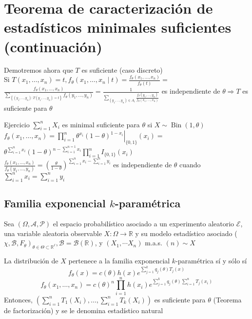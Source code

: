   \section*{Teorema de caracterización de estadísticos minimales suficientes (continuación)}
  Demotremos ahora que $T$ es suficiente (caso discreto)\\
  Si $T\left(x_{1}, \ldots, x_{n}\right)=t, f_{\theta}\left(x_{1}, \ldots, x_{n} \mid t\right)=\frac{f_{\theta}\left(x_{1}, \ldots, x_{n}\right)}{f_{\theta}(t)}=$\\
  $\frac{f_{\theta}\left(x_{1}, \ldots, x_{n}\right)}{\sum_{\left\{\left(y_{1}, \ldots, y_{n}\right): T\left(y_{1}, \ldots, y_{n}\right)=t\right\}} f_{\theta}\left(y_{1}, \ldots, y_{n}\right)}=\frac{1}{\sum_{\left(y_{1}, \ldots, y_{n}\right) \in A_{t}} \frac{f_{\theta}\left(y_{1}, \ldots, y_{n}\right)}{f_{\theta}\left(x_{1}, \ldots, x_{n}\right)}}$ es independiente de $\theta \Rightarrow T$ es suficiente para $\theta$
  
  Ejercicio $\sum_{i=1}^{n} X_{i}$ es minimal suficiente para $\theta$ si $X \sim \operatorname{Bin}(1, \theta)$\\
  $f_{\theta}\left(x_{1}, \ldots, x_{n}\right)=\left.\prod_{i=1}^{n} \theta^{x_{i}}(1-\theta)^{1-x_{i}}\right|_{\{0,1\}}\left(x_{i}\right)=$\\
  $\theta^{\sum_{i=1}^{n} x_{i}}(1-\theta)^{n-\sum_{i=1}^{n=1} x_{i}} \prod_{i=1}^{n} I_{\{0,1\}}\left(x_{i}\right)$\\
  $\frac{f_{\theta}\left(x_{1}, \ldots, x_{n}\right)}{f_{\theta}\left(y_{1}, \ldots, y_{n}\right)}=\left(\frac{\theta}{1-\theta}\right)^{\sum_{i=1}^{n} x_{i}-\sum_{i=1}^{n} y_{i}}$ es independiente de $\theta$ cuando\\
  $\sum_{i=1}^{n} x_{i}=\sum_{i=1}^{n} y_{i}$
  
  \subsection*{Familia exponencial $k$-paramétrica}
  
  \begin{definición}
  Sea $(\Omega, \mathcal{A}, \mathcal{P})$ el espacio probabilístico asociado a un experimento aleatorio $\mathcal{E}$, una variable aleatoria observable $X: \Omega \longrightarrow \mathbb{R}$ y su modelo estadístico asociado ( $\left.\chi, \mathcal{B}, F_{\theta}\right)_{\theta \in \Theta \subset \mathbb{R}^{\ell}}, \mathcal{B}=\mathcal{B}(\mathbb{R})$, y $\left(X_{1}, \cdots X_{n}\right)$ m.a.s. $(n) \sim X$
  
  La distribución de $X$ pertenece a la familia exponencial $k$-paramétrica sí y sólo sí
  \[f_{\theta}(x)=c(\theta) h(x) e^{\sum_{j=1}^{k} q_{j}(\theta) T_{j}(x)}\]
  \[f_{\theta}\left(x_{1}, \ldots, x_{n}\right)=c(\theta)^{n} \prod_{i=1}^{n} h\left(x_{i}\right) e^{\sum_{j=1}^{k} q_{j}(\theta) \sum_{i=1}^{n} T_{j}\left(x_{i}\right)}\]
  Entonces, $\left(\sum_{i=1}^{n} T_{1}\left(X_{i}\right), \ldots, \sum_{i=1}^{n} T_{k}\left(X_{i}\right)\right)$ es suficiente para $\theta$ (Teorema de factorización) y se le denomina estadístico natural
  \end{definición}
  
